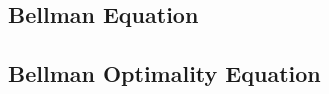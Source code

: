 \subsection{Bellman Equation}\label{subsec:bellman-equation}
%
%
%
%
%

\subsection{Bellman Optimality Equation}\label{subsec:bellman-optimality-equation}
%
%

